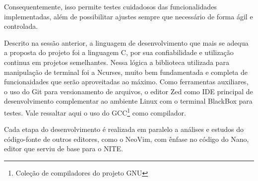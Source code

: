 Consequentemente, isso permite testes cuidadosos das funcionalidades implementadas,
além de possibilitar ajustes sempre que necessário de forma ágil e controlada.

Descrito na sessão anterior, a linguagem de desenvolvimento que mais se adequa a
proposta do projeto foi a linguagem C, por sua confiabilidade e utilização
continua em projetos semelhantes. Nessa lógica a biblioteca utilizada para manipulação
de terminal foi a Ncurses, muito bem fundamentada e completa de funcionaidades
que serão aproveitadas ao máximo. Como ferramentas auxiliares, o uso do Git para
versionamento de arquivos, o editor Zed como IDE principal de desenvolvimento complementar ao ambiente
Linux com o terminal BlackBox para testes. Vale ressaltar aqui o uso do
GCC\footnote{Coleção de compiladores do projeto GNU} como compilador.

Cada etapa do desenvolvimento é realizada em paralelo a análises e estudos do código-fonte
de outros editores, como o NeoVim, com ênfase no código do Nano, editor que
serviu de base para o NITE.
